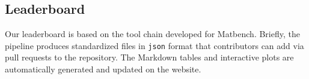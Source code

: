 

\subsection{Leaderboard}
Our leaderboard is based on the tool chain developed for Matbench.\autocite{Dunn_2020} 
Briefly, the \chembench pipeline produces standardized files in \texttt{json} format that contributors can add via pull requests to the \chembench repository.
The Markdown tables and interactive plots are automatically generated and updated on the \chembench website.

\clearpage

\printnoidxglossary[type=\acronymtype, nonumberlist]  %